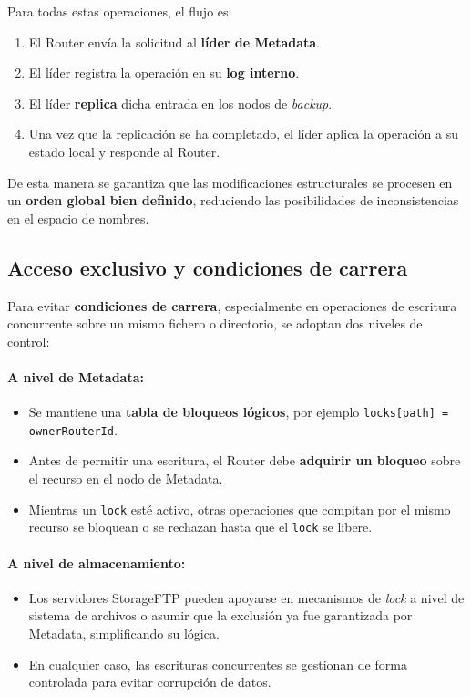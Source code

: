 \documentclass{article}
\begin{document}
Para todas estas operaciones, el flujo es:
\begin{enumerate}
    \item El Router envía la solicitud al \textbf{líder de Metadata}.
    \item El líder registra la operación en su \textbf{log interno}.
    \item El líder \textbf{replica} dicha entrada en los nodos de \emph{backup}.
    \item Una vez que la replicación se ha completado, el líder aplica la operación a su estado local y responde al Router.
\end{enumerate}
De esta manera se garantiza que las modificaciones estructurales se procesen en un \textbf{orden global bien definido}, reduciendo las posibilidades de inconsistencias en el espacio de nombres.

\subsection{Acceso exclusivo y condiciones de carrera}
Para evitar \textbf{condiciones de carrera}, especialmente en operaciones de escritura concurrente sobre un mismo fichero o directorio, se adoptan dos niveles de control:

\paragraph{A nivel de Metadata:}
\begin{itemize}
    \item Se mantiene una \textbf{tabla de bloqueos lógicos}, por ejemplo \texttt{locks[path] = ownerRouterId}.
    \item Antes de permitir una escritura, el Router debe \textbf{adquirir un bloqueo} sobre el recurso en el nodo de Metadata.
    \item Mientras un \texttt{lock} esté activo, otras operaciones que compitan por el mismo recurso se bloquean o se rechazan hasta que el \texttt{lock} se libere.
\end{itemize}

\paragraph{A nivel de almacenamiento:}
\begin{itemize}
    \item Los servidores StorageFTP pueden apoyarse en mecanismos de \emph{lock} a nivel de sistema de archivos o asumir que la exclusión ya fue garantizada por Metadata, simplificando su lógica.
    \item En cualquier caso, las escrituras concurrentes se gestionan de forma controlada para evitar corrupción de datos.
\end{itemize}
\end{document}
